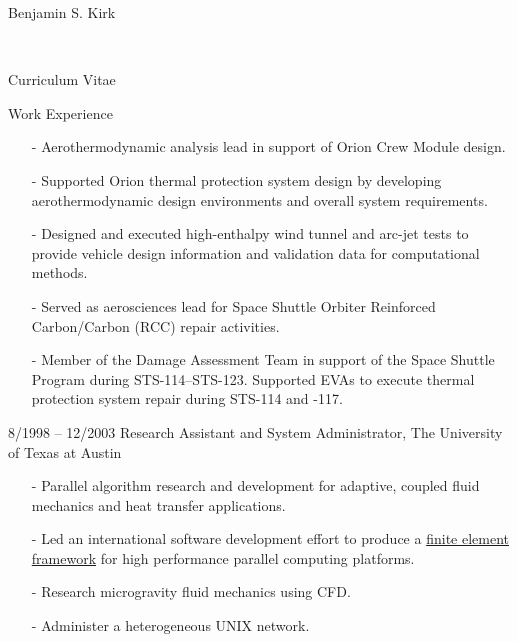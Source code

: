 \documentclass[10pt]{report}
\begin{document}
\begin{cv}{\centerline{\Large Benjamin S. Kirk}\\
    \centerline{\large Curriculum Vitae}}
\begin{cvlist}{Work Experience}
\begin{itemize}
        \item[-]
          Aerothermodynamic analysis lead in support of Orion Crew Module design.
        \item[-]
          Supported Orion thermal protection system design by developing aerothermodynamic
          design environments and overall system requirements.
        \item[-]
          Designed and executed high-enthalpy wind tunnel and arc-jet tests to provide
          vehicle design information and validation data for computational methods.
        \item[-]
          Served as aerosciences lead for Space Shuttle Orbiter Reinforced Carbon/Carbon (RCC)
          repair activities.
        \item[-]
          Member of the Damage Assessment Team in support of the Space Shuttle Program
          during STS-114--STS-123.  Supported EVAs to execute thermal protection system
          repair during STS-114 and -117.
      \end{itemize}

    \item[8/1998 -- 12/2003]
      Research Assistant and System Administrator, The University of Texas at Austin
      \begin{itemize}
	\item[-]
	  Parallel algorithm research and development for adaptive,
	  coupled fluid mechanics and heat transfer applications.
	\item[-]
	  Led an international software development effort to produce
          a \href{http://libmesh.sourceforge.net}{finite element framework}
	  for high performance parallel computing platforms.
	\item[-]
	  Research microgravity fluid mechanics using CFD.
	\item[-]
	  Administer a heterogeneous UNIX network.
      \end{itemize}


\end{cvlist}
\end{cv}
\end{document}
